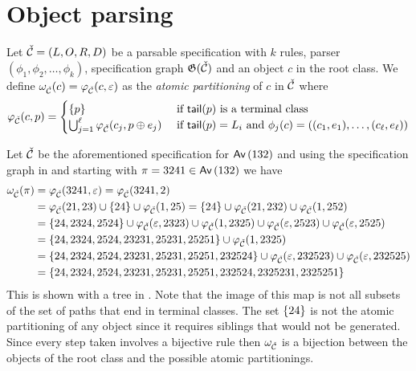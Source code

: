 \section{Object parsing}
Let $\check{\mathcal{C}} = (L,O,R,D)$ be a parsable specification with $k$ rules, parser $(\phi_1,\phi_2,\dotsc,\phi_k)$, specification graph $\mathfrak{G}(\check{\mathcal{C}})$ and an object $c$ in the root class. We define $\omega_{\check{\mathcal{C}}}(c) = \varphi_{\check{\mathcal{C}}}(c,\varepsilon)$ as the \emph{atomic partitioning} of $c$ in $\check{\mathcal{C}}$ where \[
    \varphi_{\check{\mathcal{C}}}(c,p) = \begin{cases}
        \left\{p\right\} & \text{ if } \textsf{tail}(p) \text{ is a terminal class}\\
        \bigcup_{j=1}^\ell\varphi_{\check{\mathcal{C}}}(c_j,p \oplus e_j) & \text{ if }
        \textsf{tail}(p) = L_i \text{ and } \phi_j(c) = ((c_1,e_1),\dotsc,(c_\ell,e_\ell))
    \end{cases}
\]

Let $\check{\mathcal{C}}$ be the aforementioned specification for $\textsf{Av}\left(132\right)$ and using the specification graph in  and starting with $\pi=3241 \in \textsf{Av}\left(132\right)$ we have
\begin{align*}
    \omega_{\check{\mathcal{C}}}(\pi) &= \varphi_{\check{\mathcal{C}}}(3241,\varepsilon)
    = \varphi_{\check{\mathcal{C}}}(3241, 2) \\
    &= \varphi_{\check{\mathcal{C}}}(21,23) \cup \left\{24\right\} \cup \varphi_{\check{\mathcal{C}}}(1,25)
    = \left\{24\right\} \cup \varphi_{\check{\mathcal{C}}}(21,232) \cup \varphi_{\check{\mathcal{C}}}(1,252) \\
    &= \left\{24, 2324, 2524\right\} \cup \varphi_{\check{\mathcal{C}}}(\varepsilon,2323) \cup \varphi_{\check{\mathcal{C}}}(1,2325) \cup \varphi_{\check{\mathcal{C}}}(\varepsilon, 2523) \cup  \varphi_{\check{\mathcal{C}}}(\varepsilon, 2525) \\
    &= \left\{24, 2324, 2524, 23231, 25231, 25251\right\} \cup \varphi_{\check{\mathcal{C}}}(1,2325) \\
    &= \left\{24, 2324, 2524, 23231, 25231, 25251, 232524\right\} \cup \varphi_{\check{\mathcal{C}}}(\varepsilon,232523) \cup \varphi_{\check{\mathcal{C}}}(\varepsilon,232525) \\
    &= \left\{24, 2324, 2524, 23231, 25231, 25251, 232524,2325231,2325251\right\}
\end{align*}
This is shown with a tree in . Note that the image of this map is not all subsets of the set of paths that end in terminal classes. The set $\left\{24\right\}$ is not the atomic partitioning of any object since it requires siblings that would not be generated. Since every step taken involves a bijective rule then $\omega_{\check{\mathcal{C}}}$ is a bijection between the objects of the root class and the possible atomic partitionings.


